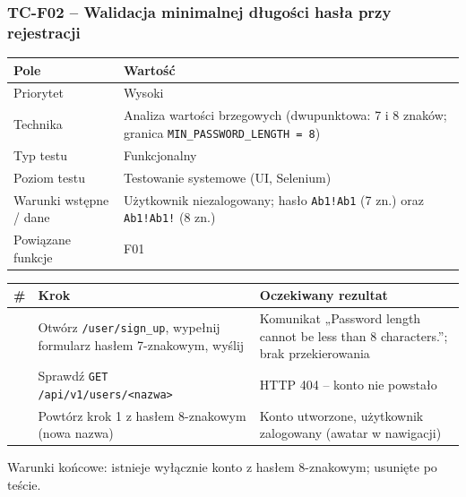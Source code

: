 \subsubsection{TC-F02 – Walidacja minimalnej długości hasła przy rejestracji}
{\small
\par\smallskip\noindent\begin{tabular}{>{\raggedright\arraybackslash}p{}>{\raggedright\arraybackslash}p{}}
\toprule
\textbf{Pole} & \textbf{Wartość} \\
\midrule
Priorytet & Wysoki \\
Technika & Analiza wartości brzegowych (dwupunktowa: 7 i 8 znaków; granica \texttt{MIN\_\allowbreak{}PASSWORD\_\allowbreak{}LENGTH = 8}) \\
Typ testu & Funkcjonalny \\
Poziom testu & Testowanie systemowe (UI, Selenium) \\
Warunki wstępne / dane & Użytkownik niezalogowany; hasło \texttt{Ab1!Ab1} (7 zn.) oraz \texttt{Ab1!Ab1!} (8 zn.) \\
Powiązane funkcje & F01 \\
\bottomrule
\end{tabular}\par\smallskip
}
{\small
\par\smallskip\noindent\begin{tabular}{>{\raggedright\arraybackslash}p{}>{\raggedright\arraybackslash}p{}>{\raggedright\arraybackslash}p{}}
\toprule
\textbf{\#} & \textbf{Krok} & \textbf{Oczekiwany rezultat} \\
\midrule
1 & Otwórz \texttt{/\allowbreak{}user/\allowbreak{}sign\_\allowbreak{}up}, wypełnij formularz hasłem 7-znakowym, wyślij & Komunikat „Password length cannot be less than 8 characters.”; brak przekierowania \\
2 & Sprawdź \texttt{GET /\allowbreak{}api/\allowbreak{}v1/\allowbreak{}users/\allowbreak{}<nazwa>} & HTTP 404 – konto nie powstało \\
3 & Powtórz krok 1 z hasłem 8-znakowym (nowa nazwa) & Konto utworzone, użytkownik zalogowany (awatar w nawigacji) \\
\bottomrule
\end{tabular}\par\smallskip
}
Warunki końcowe: istnieje wyłącznie konto z hasłem 8-znakowym; usunięte po teście.

